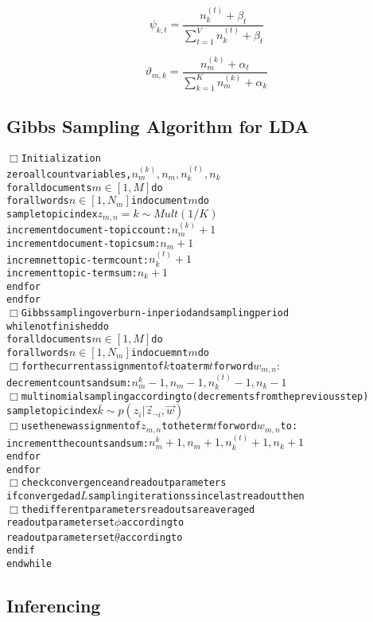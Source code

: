 \begin{equation}\label{eqn:phi}
\psi_{k,t} = \frac{n_k^{(t)} + \beta_t}{\sum_{t=1}^{V} n_k^{(t)} + \beta_t}
\end{equation}

\begin{equation}\label{eqn:theta}
\vartheta_{m,k} = \frac{n_m^{(k)} + \alpha_t}{\sum_{k=1}^{K} n_m^{(k)} + \alpha_k} 
\end{equation}

\pagebreak

\subsection*{Gibbs Sampling Algorithm for LDA}

\begin{alltt}
\(\Box\) Initialization
zero all count variables, \(n_m^{(k)},n_m,n_k^{(t)},n_k\)
for all documents \(m \in [1,M]\) do
  for all words \(n \in [1,N_m]\) in document \(m\) do
    sample topic index \(z_{m,n} = k \sim Mult(1/K)\)
    increment document-topic count: \(n_m^{(k)} + 1\)
    increment document-topic sum: \(n_m + 1\)
    incremnet topic-term count: \(n_k^{(t)} + 1\)
    increment topic-term sum: \(n_k + 1\)
  end for
end for
\(\Box\) Gibbs sampling over burn-in period and sampling period
while not finished do
  for all documents \(m \in [1,M]\) do
    for all words \(n \in [1,N_m]\) in docuemnt \(m\) do
      \(\Box\) for the current assignment of \(k\) to a term \(t\) for word \(w_{m,n}\) \(\colon\)
      decrement counts and sum:\(n_m^{k}-1,n_m-1,n_k^{(t)}-1,n_k-1\)
      \(\Box\) multinomial sampling according to  (decrements from the previous step)
      sample topic index \(\bar{k} \sim p(z_i|\vec{z}_{\neg i},\vec{w})\)
      \(\Box\) use the new assignment of \(z_{m,n}\) to the term \(t\) for word \(w_{m,n}\) to:
      increment the counts and sum:\(n_m^{k}+1,n_m+1,n_k^{(t)}+1,n_k+1\)
    end for
  end for
  \(\Box\) check convergence and read out parameters
  if converged ad \(L\) sampling iterations since last read out then
    \(\Box\) the different parameters read outs are averaged
    read out parameter set \(\underline{\phi}\) according to 
    read out parameter set \(\underline{\theta}\) according to 
  end if
end while
\end{alltt}

\subsection{Inferencing}

